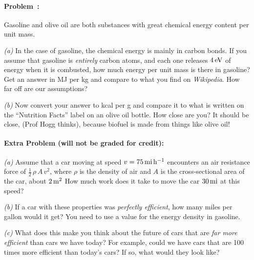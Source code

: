 \documentclass[12pt]{article}
\begin{document}
\paragraph{Problem~\theproblem:}%
Gasoline and olive oil are both substances with great chemical energy
content per unit mass.

\textsl{(a)} In the case of gasoline, the chemical energy is mainly in
carbon bonds.  If you assume that gasoline is \emph{entirely} carbon
atoms, and each one releases $4\,\mathrm{eV}$ of energy when it is combusted, how
much energy per unit mass is there in gasoline?  Get an answer in MJ
per kg and compare to what you find on \textit{Wikipedia}.  How far off
are our assumptions?

\textsl{(b)} Now convert your answer to kcal per g and compare it to
what is written on the ``Nutrition Facts'' label on an olive oil
bottle.  How close are you?  It should be close, (Prof Hogg thinks), because
biofuel is made from things like olive oil!

\paragraph{Extra Problem (will not be graded for credit):}%
\textsl{(a)} Assume that a car moving at speed
$v=75\,\mathrm{mi}\,\mathrm{h}^{-1}$ encounters an air resistance force of
$\frac{1}{2}\,\rho\,A\,v^2$, where $\rho$ is the density of air and $A$ is the
cross-sectional area of the car, about $2\,\mathrm{m}^2$ How much work does it
take to move the car $30\,\mathrm{mi}$ at this speed?

\textsl{(b)} If a car with these properties was \emph{perfectly
  efficient}, how many miles per gallon would it get? You need to use a value for
the energy density in gasoline.

\textsl{(c)} What does this
make you think about the future of cars that are \emph{far more
  efficient} than cars we have today? For example, could we have cars
that are 100 times more efficient than today's cars? If so, what
would they look like?
\end{document}
